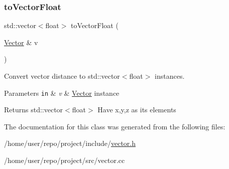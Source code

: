 \subsubsection{\texorpdfstring{to\+Vector\+Float}{toVectorFloat}}
{\footnotesize\ttfamily std\+::vector$<$float$>$ to\+Vector\+Float (\begin{DoxyParamCaption}\item[{\hyperlink{classcsci3081_1_1Vector}{Vector} \&}]{v }\end{DoxyParamCaption})\hspace{0.3cm}{\ttfamily [friend]}}



Convert vector distance to std\+::vector$<$float$>$ instances. 


\begin{DoxyParams}[1]{Parameters}
\mbox{\tt in}  & {\em v} & \hyperlink{classcsci3081_1_1Vector}{Vector} instance \\
\hline
\end{DoxyParams}
\begin{DoxyReturn}{Returns}
std\+::vector$<$float$>$ Have x,y,z as its elements 
\end{DoxyReturn}


The documentation for this class was generated from the following files\+:\begin{DoxyCompactItemize}
\item 
/home/user/repo/project/include/\hyperlink{vector_8h}{vector.\+h}\item 
/home/user/repo/project/src/vector.\+cc\end{DoxyCompactItemize}
